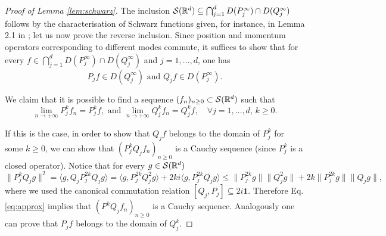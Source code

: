 \documentclass[preprint]{elsarticle}
\theoremstyle{definition}
\def\RR{\mathbb{R}}
\begin{document}
\begin{proof}[Proof of Lemma \ref{lem:schwarz}]
The inclusion ${\cal S}(\RR^d) \subseteq \bigcap_{j=1}^{d} D(P^\infty_j) \cap D(Q^\infty_j)$ follows by the characterisation of Schwarz functions given, for instance, in Lemma 2.1 in \cite{KKW16}; let us now prove the reverse inclusion. Since position and momentum operators corresponding to different modes commute, it suffices to show that for every $f \in \bigcap_{j=1}^{d} D(P^\infty_j) \cap D(Q^\infty_j)$ and $j=1, \dots, d$, one has
$$P_jf \in D(Q_j^\infty) \text{ and } Q_jf \in D(P_j^\infty).$$

We claim that it is possible to find a sequence $(f_n)_{n \geq 0} \subset {\cal S}(\RR^d)$ such that
\begin{equation}\label{eq:approx}\lim_{n \rightarrow +\infty} P_j^kf_n=P_j^k f, \text{ and } \lim_{n \rightarrow +\infty} Q_j^kf_n=Q_j^k f, \quad \forall j=1, \dots ,d , \, k \geq 0.\end{equation}

If this is the case, in order to show that $Q_j f$ belongs to the domain of $P^k_j$ for some $k\geq 0$, we can show that $(P_j^kQ_jf_n)_{n \geq 0}$ is a Cauchy sequence (since $P_j^k$ is a closed operator). Notice that for every $g \in {\cal S}(\RR^d)$
$$\|P_j^kQ_j g\|^2=\langle g,Q_jP^{2k}_jQ_j g \rangle=\langle g,P_j^{2k}Q_j^2 g \rangle + 2ki\langle g, P_j^{2k} Q_jg \rangle \leq \|P_j^{2k}g\|\|Q^2_j g\|+ 2k\|P^{2k}_j g\|\|Q_j g\|,$$
where we used the canonical commutation relation $[Q_j,P_j]\subseteq2i\mathbf{1}.$ Therefore Eq. \eqref{eq:approx} implies that $(P^kQ_jf_n)_{n \geq 0}$ is a Cauchy sequence. Analogously one can prove that $P_j f$ belongs to the domain of $Q^k_j$. 


\end{proof}
\end{document}
